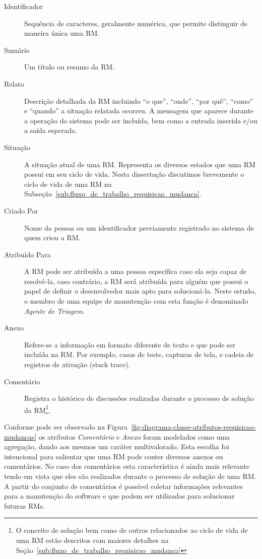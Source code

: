 \begin{description}
    \item [Identificador] Sequência de caracteres, geralmente numérica,  que
        permite distinguir de maneira única uma RM\@.
	\item [Sumário] Um título ou resumo da RM\@.
    \item [Relato] Descrição detalhada da RM incluindo ``o que'', ``onde'',
        ``por quê'', ``como'' e ``quando'' a situação relatada ocorreu. A
        mensagem que aparece durante a operação do sistema pode ser incluída,
        bem como a entrada inserida e/ou a saída esperada.
	\item [Situação] A situação atual de uma RM\@. Representa os diversos
		estados que uma RM possui em seu ciclo de vida. Nesta dissertação
		discutimos brevemente o ciclo de vida de uma RM na
		Subseção~\ref{sub:fluxo_de_trabalho_requisicao_mudanca}.
    \item [Criado Por] Nome da pessoa ou um identificador previamente registrado
        no sistema de quem criou a RM\@.
    \item [Atribuído Para] A RM pode ser atribuída a uma pessoa específica caso
        ela seja capaz de resolvê-la, caso contrário, a RM será atribuída para
        alguém que possui o papel de definir o desenvolvedor mais apto para
        solucioná-la. Neste estudo, o membro de uma equipe de manutenção com
        esta função é denominado \textit{Agente de Triagem}.
    \item [Anexo] Refere-se a informação em formato diferente de texto e que
        pode ser incluída na RM\@. Por exemplo, casos de teste, capturas de
        tela, e cadeia de registros de ativação (stack trace).
    \item [Comentário] Registra o histórico de discussões realizadas durante o
        processo de solução da RM\@\footnote{O conceito de solução bem como de
            outros relacionados ao ciclo de vida de uma RM estão descritos com
        maiores detalhes na Seção~\ref{sub:fluxo_de_trabalho_requisicao_mudanca}}.
\end{description}

Conforme pode ser observado na
Figura~\ref{fig:diagrama-classe-atributos-requisicao-mudancas} os atributos
\textit{Comentário} e \textit{Anexo} foram modelados como uma agregação, dando
aos mesmos um caráter multivalorado. Esta escolha foi intencional para salientar
que uma RM pode conter diversos anexos ou comentários. No caso dos comentários
esta característica é ainda mais relevante tendo em vista que eles são
realizados durante o processo de solução de uma RM\@. A partir do conjunto de
comentários é possível coletar informações relevantes para a manutenção do
software e que podem ser utilizadas para solucionar futuras RMs.

